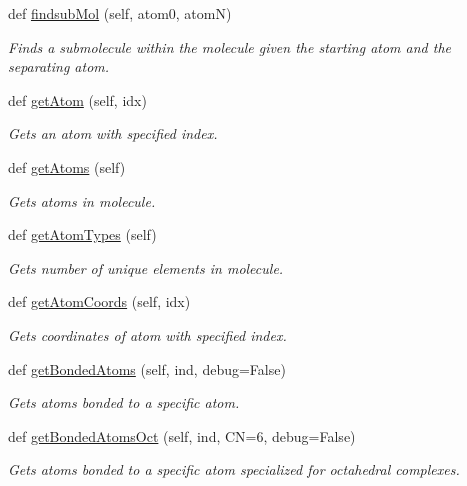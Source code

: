 \begin{DoxyCompactItemize}
def \hyperlink{classmolSimplify_1_1Classes_1_1mol3D_1_1mol3D_a0b5cecd561856f3b3a7525ce75bc5282}{findsub\+Mol} (self, atom0, atomN)
\begin{DoxyCompactList}\small\item\em Finds a submolecule within the molecule given the starting atom and the separating atom. \end{DoxyCompactList}\item 
def \hyperlink{classmolSimplify_1_1Classes_1_1mol3D_1_1mol3D_ad30b31562cb3c57c2758554ff7e3714d}{get\+Atom} (self, idx)
\begin{DoxyCompactList}\small\item\em Gets an atom with specified index. \end{DoxyCompactList}\item 
def \hyperlink{classmolSimplify_1_1Classes_1_1mol3D_1_1mol3D_a28a0a4e056758a2cc390899e9b34baaa}{get\+Atoms} (self)
\begin{DoxyCompactList}\small\item\em Gets atoms in molecule. \end{DoxyCompactList}\item 
def \hyperlink{classmolSimplify_1_1Classes_1_1mol3D_1_1mol3D_a53c044279fd5d0dace4f220c950921fa}{get\+Atom\+Types} (self)
\begin{DoxyCompactList}\small\item\em Gets number of unique elements in molecule. \end{DoxyCompactList}\item 
def \hyperlink{classmolSimplify_1_1Classes_1_1mol3D_1_1mol3D_a67307accd49f78a076a0139591fdefb7}{get\+Atom\+Coords} (self, idx)
\begin{DoxyCompactList}\small\item\em Gets coordinates of atom with specified index. \end{DoxyCompactList}\item 
def \hyperlink{classmolSimplify_1_1Classes_1_1mol3D_1_1mol3D_aac602cfe9499277393a3d23b55f71db0}{get\+Bonded\+Atoms} (self, ind, debug=False)
\begin{DoxyCompactList}\small\item\em Gets atoms bonded to a specific atom. \end{DoxyCompactList}\item 
def \hyperlink{classmolSimplify_1_1Classes_1_1mol3D_1_1mol3D_a054076c86f015de56353017cc391ba4c}{get\+Bonded\+Atoms\+Oct} (self, ind, CN=6, debug=False)
\begin{DoxyCompactList}\small\item\em Gets atoms bonded to a specific atom specialized for octahedral complexes. \end{DoxyCompactList}\item 

\end{DoxyCompactItemize}
